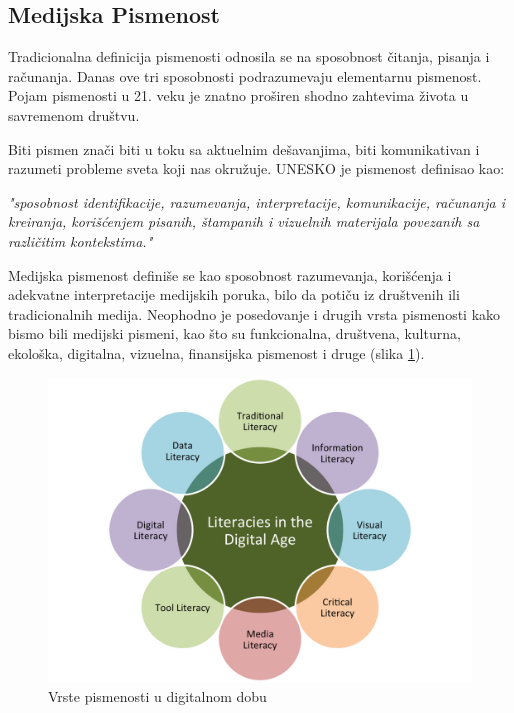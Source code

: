 \documentclass[a4paper]{article}
\begin{document}
\begin{itemize}
\section{Medijska Pismenost}
\label{sec:naslovN}

Tradicionalna definicija pismenosti odnosila se na sposobnost čitanja, pisanja i računanja. Danas ove tri sposobnosti podrazumevaju elementarnu pismenost. Pojam pismenosti u 21. veku je znatno proširen shodno zahtevima života u savremenom društvu.

Biti pismen znači biti u toku sa aktuelnim dešavanjima, biti komunikativan i razumeti probleme sveta koji nas okružuje. UNESKO je pismenost definisao kao:

\noindent \textit{"sposobnost identifikacije, razumevanja, interpretacije, komunikacije, računanja i kreiranja, korišćenjem pisanih, štampanih i vizuelnih materijala povezanih sa različitim kontekstima."}

Medijska pismenost definiše se kao sposobnost razumevanja, korišćenja i adekvatne interpretacije medijskih poruka, bilo da potiču iz društvenih ili tradicionalnih medija. Neophodno je posedovanje i drugih vrsta pismenosti kako bismo bili medijski pismeni, kao što su funkcionalna, društvena, kulturna, ekološka, digitalna, vizuelna, finansijska pismenost i druge (slika \ref{fig:literacies}).  

\newpage
\begin{figure}[h!]
\begin{center}
\includegraphics[scale=0.35]{literacies.png}
\end{center}
\caption{Vrste pismenosti u digitalnom dobu}
\label{fig:literacies}
\end{figure}


\end{itemize}
\end{document}
